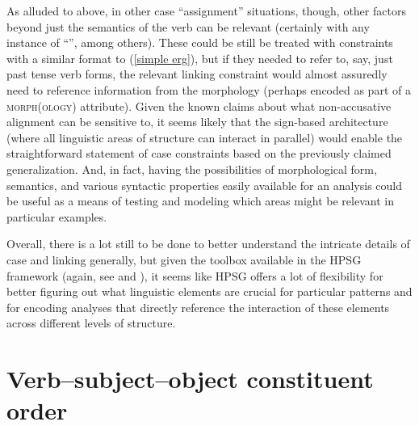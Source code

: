 \documentclass[output=paper,biblatex,babelshorthands,newtxmath,draftmode,colorlinks,citecolor=brown]{langscibook}
\begin{document}
As alluded to above, in other case ``assignment'' situations, though, other factors beyond just the semantics of the verb can be relevant (certainly with any instance of ``'', among others). These could be still be treated with constraints with a similar format to (\ref{simple erg}), but if they needed to refer to, say, just past tense verb forms, the relevant linking constraint would almost assuredly need to reference information from the morphology (perhaps encoded as part of a \textsc{morph(ology)} attribute). Given the known claims about what non-accusative alignment can be sensitive to,  it seems likely that the sign-based architecture (where all linguistic areas of structure can interact in parallel) would enable the straightforward statement of case constraints based on the previously claimed generalization. And, in fact, having the possibilities of morphological form, semantics, and various syntactic properties easily available for an analysis could be useful as a means of testing and modeling which areas might be relevant in particular examples.

\largerpage[-1]
Overall, there is a lot still to be done to better understand the intricate details of case and linking generally, but given the toolbox available in the HPSG framework (again, see  and ), it seems like HPSG offers a lot of flexibility for better figuring out what linguistic elements are crucial for particular patterns and for encoding analyses that directly reference the interaction of these elements across different levels of structure.      

\section{Verb--subject--object constituent order}
\label{ul:sec-vso}
\end{document}
